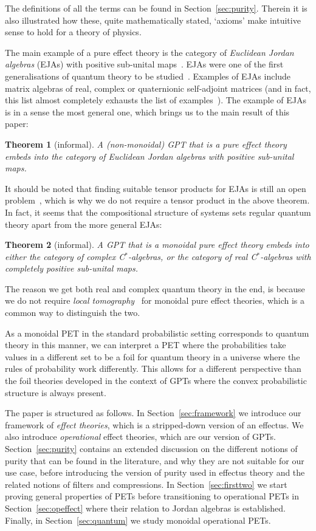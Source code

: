 \documentclass[b5paper,onecolumn,12pt,accepted=2019-05-03, issue=1, volume=1, shorttitle=papers/compositionality-1-1]{compositionalityarticle}
\numberwithin{counter}{section}
\newtheorem*{theorem*}{Theorem}
\begin{document}
The definitions of all the terms can be found in Section~\ref{sec:purity}. Therein it is also illustrated how these, quite mathematically stated, `axioms' make intuitive sense to hold for a theory of physics.

The main example of a pure effect theory is the category of \emph{Euclidean Jordan algebras} (EJAs) with positive sub-unital maps~\cite{westerbaan2018puremaps}. EJAs were one of the first generalisations of quantum theory to be studied~\cite{jordan1933}. Examples of EJAs include matrix algebras of real, complex or quaternionic self-adjoint matrices (and in fact, this list almost completely exhausts the list of examples~\cite{jordan1993algebraic}). The example of EJAs is in a sense the most general one, which brings us to the main result of this paper:
\begin{theorem*}[informal]
    A (non-monoidal) GPT that is a pure effect theory embeds into the category of Euclidean Jordan algebras with positive sub-unital maps.
\end{theorem*}

\noindent It should be noted that finding suitable tensor products for EJAs is still an open problem~\cite{barnum2016composites}, which is why we do not require a tensor product in the above theorem. In fact, it seems that the compositional structure of systems sets regular quantum theory apart from the more general EJAs:

\begin{theorem*}[informal]
    A GPT that is a monoidal pure effect theory embeds into either the category of complex C$^*$-algebras, or the category of real C$^*$-algebras with completely positive sub-unital maps.
\end{theorem*}
\noindent The reason we get both real and complex quantum theory in the end, is because we do not require \emph{local tomography}~\cite{hardy2012limited} for monoidal pure effect theories, which is a common way to distinguish the two.

As a monoidal PET in the standard probabilistic setting corresponds to quantum theory in this manner, we can interpret a PET where the probabilities take values in a different set to be a foil for quantum theory in a universe where the rules of probability work differently. This allows for a different perspective than the foil theories developed in the context of GPTs where the convex probabilistic structure is always present.

The paper is structured as follows. In Section~\ref{sec:framework} we introduce our framework of \emph{effect theories}, which is a stripped-down version of an effectus. We also introduce \emph{operational} effect theories, which are our version of GPTs. 
Section~\ref{sec:purity} contains an extended discussion on the different notions of purity that can be found in the literature, and why they are not suitable for our use case, before introducing the version of purity used in effectus theory and the related notions of filters and compressions.
In Section~\ref{sec:firsttwo} we start proving general properties of PETs before transitioning to operational PETs in Section~\ref{sec:opeffect} where their relation to Jordan algebras is established. Finally, in Section~\ref{sec:quantum} we study monoidal operational PETs.
\end{document}
